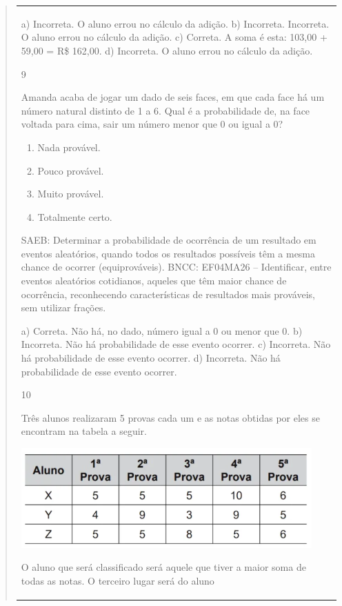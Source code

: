 \begin{mdframed}[linewidth=2pt,linecolor=salmao,roundcorner=2pt]
\begin{itemize}
{\begin{itemize}
\begin{escolha}
{\begin{quote}
{\begin{escolha}
{{{{{\begin{longtable}[]{@{}l@{}}
\begin{itemize}
{a) Incorreta. O aluno errou no cálculo da adição.
b) Incorreta. Incorreta. O aluno errou no cálculo da adição.
c) Correta. A soma é esta: 103,00 + 59,00 = R\$ 162,00.
d) Incorreta. O aluno errou no cálculo da adição.

\num{9}

Amanda acaba de jogar um dado de seis faces, em que cada face
há um número natural distinto de 1 a 6. Qual é a probabilidade de, na
face voltada para cima, sair um número menor que 0 ou igual a 0?

\begin{enumerate}
\item
  Nada provável.
\item
  Pouco provável.
\item
  Muito provável.
\item
  Totalmente certo.
\end{enumerate}

SAEB: Determinar a probabilidade de ocorrência de um
resultado em eventos aleatórios, quando todos os resultados possíveis
têm a mesma chance de ocorrer (equiprováveis).
BNCC: EF04MA26 -- Identificar, entre eventos aleatórios cotidianos, aqueles que têm maior chance de
ocorrência, reconhecendo características de resultados mais prováveis, sem utilizar frações.

a) Correta. Não há, no dado, número igual a 0 ou menor que 0.
b) Incorreta. Não há probabilidade de esse evento ocorrer.
c) Incorreta. Não há probabilidade de esse evento ocorrer.
d) Incorreta. Não há probabilidade de esse evento ocorrer.

\num{10}

Três alunos realizaram 5 provas cada um e as notas obtidas por eles se
encontram na tabela a seguir.


\includegraphics[width=4.38462in,height=1.50708in]{media/image157.png}

O aluno que será classificado será aquele que tiver a maior
soma de todas as notas. O terceiro lugar será do aluno

}
\end{itemize}
\end{longtable}}}}}}
\end{escolha}}
\end{quote}}
\end{escolha}
\end{itemize}}
\end{itemize}
\end{mdframed}
